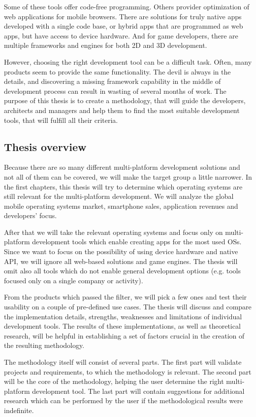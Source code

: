 \documentclass[english,master,public,dept460,male,cpdeclaration,oneside]{diploma}
\begin{document}
Some of these tools offer code-free programming. Others provider optimization of web applications for mobile browsers. There are solutions for truly native apps developed with a single code base, or hybrid apps that are programmed as web apps, but have access to device hardware. And for game developers, there are multiple frameworks and engines for both 2D and 3D development. 

However, choosing the right development tool can be a difficult task. Often, many products seem to provide the same functionality. The devil is always in the details, and discovering a missing framework capability in the middle of development process can result in wasting of several months of work. The purpose of this thesis is to create a methodology, that will guide the developers, architects and managers and help them to find the most suitable development tools, that will fulfill all their criteria.

\subsection{Thesis overview}
Because there are so many different multi-platform development solutions and not all of them can be covered, we will make the target group a little narrower. In the first chapters, this thesis will try to determine which operating systems are still relevant for the multi-platform development. We will analyze the global mobile operating systems market, smartphone sales, application revenues and developers’ focus. 

After that we will take the relevant operating systems and focus only on multi-platform development tools which enable creating apps for the most used OSs. Since we want to focus on the possibility of using device hardware and native API, we will ignore all web-based solutions and game engines. The thesis will omit also all tools which do not enable general development options (e.g. tools focused only on a single company or activity).

From the products which passed the filter, we will pick a few ones and test their usability on a couple of pre-defined use cases. The thesis will discuss and compare the implementation details, strengths, weaknesses and limitations of individual development tools. The results of these implementations, as well as theoretical research, will be helpful in establishing a set of factors crucial in the creation of the resulting methodology.

The methodology itself will consist of several parts. The first part will validate projects and requirements, to which the methodology is relevant. The second part will be the core of the methodology, helping the user determine the right multi-platform development tool. The last part will contain suggestions for additional research which can be performed by the user if the methodological results were indefinite.
\end{document}
